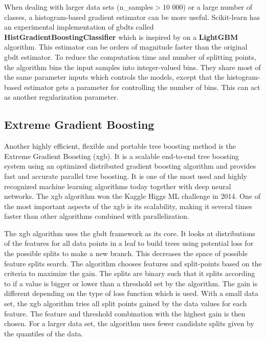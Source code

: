 \documentclass[a4paper, american, 12pt]{report}
\begin{document}
	When dealing with larger data sets (n\_samples$>$10 000) or a large number of classes, a histogram-based gradient estimator can be more useful. Scikit-learn has an experimental implementation of \acrshort{gbdt}s called \textbf{HistGradientBoostingClassifier} which is inspired by \citet{lightgbm} on a \textbf{LightGBM} algorithm. This estimator can be orders of magnitude faster than the original \acrshort{gbdt} estimator. To reduce the computation time and number of splitting points, the algorithm bins the input samples into integer-valued bins. They share most of the same parameter inputs which controls the models, except that the histogram-based estimator gets a parameter for controlling the number of bins. This can act as another regularization parameter. 
	
	
	\subsection{Extreme Gradient Boosting}
	\label{subsect:Theory-XGB}
	Another highly efficient, flexible and portable tree boosting method is the Extreme Gradient Boosting (\acrshort{xgb})\cite{xgboost}. It is a scalable end-to-end tree boosting system using an optimized distributed gradient boosting algorithm and provides fast and accurate parallel tree boosting. It is one of the most used and highly recognized machine learning algorithms today together with deep neural networks. The \acrshort{xgb} algorithm won the Kaggle Higgs ML challenge in 2014\cite{MLHiggs}. One of the most important aspects of the \acrshort{xgb} is its scalability, making it several times faster than other algorithms combined with parallelization. 
	
	The \acrshort{xgb} algorithm uses the \acrshort{gbdt} framework as its core. It looks at distributions of the features for all data points in a leaf to build trees using potential loss for the possible splits to make a new branch. This decreases the space of possible feature splits search. The algorithm chooses features and split-points based on the criteria to maximize the gain. The splits are binary such that it splits according to if a value is bigger or lower than a threshold set by the algorithm. The gain is different depending on the type of loss function which is used. With a small data set, the \acrshort{xgb} algorithm tries all split points gained by the data values for each feature. The feature and threshold combination with the highest gain is then chosen. For a larger data set, the algorithm uses fewer candidate splits given by the quantiles of the data. 
	
\end{document}
